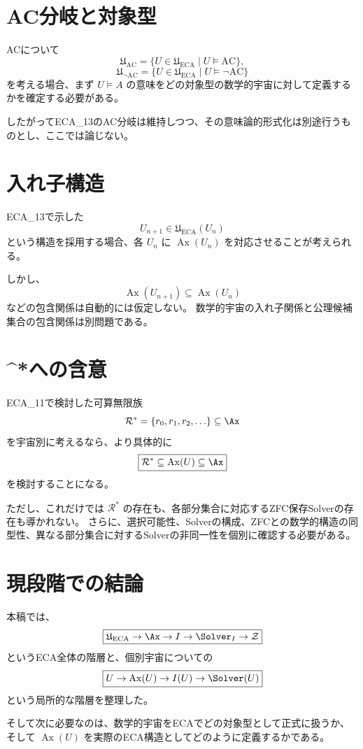 \documentclass[11pt,a4paper]{article}
\begin{document}
\section{AC分岐と対象型}
ACについて
\[
\mathfrak{U}_{\mathrm{AC}}=\{U\in\mathfrak{U}_{\mathrm{ECA}}\mid U\models\mathrm{AC}\},
\]
\[
\mathfrak{U}_{\neg\mathrm{AC}}=\{U\in\mathfrak{U}_{\mathrm{ECA}}\mid U\models\neg\mathrm{AC}\}
\]
を考える場合、まず $U\models A$ の意味をどの対象型の数学的宇宙に対して定義するかを確定する必要がある。

したがってECA_13のAC分岐は維持しつつ、その意味論的形式化は別途行うものとし、ここでは論じない。

\section{入れ子構造}
ECA_13で示した
\[
U_{n+1}\in\mathfrak{U}_{\mathrm{ECA}}(U_n)
\]
という構造を採用する場合、各 $U_n$ に $\operatorname{Ax}(U_n)$ を対応させることが考えられる。

しかし、
\[
\operatorname{Ax}(U_{n+1})\subseteq\operatorname{Ax}(U_n)
\]
などの包含関係は自動的には仮定しない。
数学的宇宙の入れ子関係と公理候補集合の包含関係は別問題である。

\section{^*への含意}
ECA_11で検討した可算無限族
\[
\mathcal{R}^*=\{r_0,r_1,r_2,\ldots\}\subseteq\Ax
\]
を宇宙別に考えるなら、より具体的に
\[
\boxed{\mathcal{R}^*\subseteq\operatorname{Ax}(U)\subseteq\Ax}
\]
を検討することになる。

ただし、これだけでは $\mathcal{R}^*$ の存在も、各部分集合に対応するZFC保存Solverの存在も導かれない。
さらに、選択可能性、Solverの構成、ZFCとの数学的構造の同型性、異なる部分集合に対するSolverの非同一性を個別に確認する必要がある。

\section{現段階での結論}
本稿では、
\[
\boxed{\mathfrak{U}_{\mathrm{ECA}}\to\Ax\to I\to\Solver_I\to\mathcal{Z}}
\]
というECA全体の階層と、個別宇宙についての
\[
\boxed{U\to\operatorname{Ax}(U)\to I(U)\to\Solver(U)}
\]
という局所的な階層を整理した。

そして次に必要なのは、数学的宇宙をECAでどの対象型として正式に扱うか、そして $\operatorname{Ax}(U)$ を実際のECA構造としてどのように定義するかである。
\end{document}
